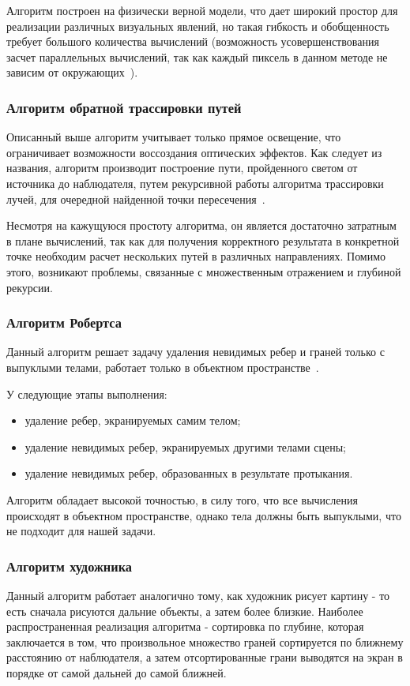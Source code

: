 Алгоритм построен на физически верной модели, что дает широкий
простор для реализации различных визуальных явлений, но такая гибкость и
обобщенность требует большого количества вычислений (возможность
усовершенствования засчет параллельных вычислений, так как каждый пиксель в
данном методе не зависим от окружающих~\cite{TPaths}).

\subsubsection{Алгоритм обратной трассировки путей}
Описанный выше алгоритм учитывает только прямое освещение, что ограничивает
возможности воссоздания оптических эффектов. Как следует из названия, алгоритм
производит построение пути, пройденного светом от источника до наблюдателя,
путем рекурсивной работы алгоритма трассировки лучей, для очередной найденной
точки пересечения~\cite{RayTracing}.

Несмотря на кажущуюся простоту алгоритма, он является достаточно затратным
в плане вычислений, так как для получения корректного результата в конкретной
точке необходим расчет нескольких путей в различных направлениях. Помимо этого,
возникают проблемы, связанные с множественным отражением и глубиной рекурсии.

\subsubsection{Алгоритм Робертса}
Данный алгоритм решает задачу удаления невидимых ребер и граней только с
выпуклыми телами, работает только в объектном пространстве~\cite{Roberts}.

У следующие этапы выполнения:
\begin{itemize}
    \item удаление ребер, экранируемых самим телом;
    \item удаление невидимых ребер, экранируемых другими телами сцены;
    \item удаление невидимых ребер, образованных в результате протыкания.
\end{itemize}

Алгоритм обладает высокой точностью, в силу того, что все
вычисления происходят в объектном пространстве, однако тела должны быть
выпуклыми, что не подходит для нашей задачи.

\subsubsection{Алгоритм художника}
Данный алгоритм работает аналогично тому, как художник рисует картину -
то есть сначала рисуются дальние объекты, а затем более близкие. Наиболее
распространенная реализация алгоритма - сортировка по глубине, которая
заключается в том, что произвольное множество граней сортируется по ближнему
расстоянию от наблюдателя, а затем отсортированные грани выводятся на экран в
порядке от самой дальней до самой ближней.

